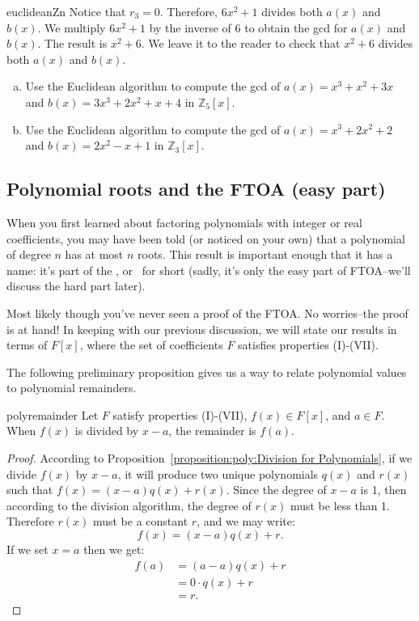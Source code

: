 \begin{example}{euclideanZn}
Notice that $r_3=0$. Therefore, $6x^2 + 1$ divides both $a(x)$ and $b(x)$. We multiply $6x^2 + 1$ by the inverse of 6 to obtain the gcd for $a(x)$ and $b(x)$. The result is $x^2+6$. We leave it to the reader to check that $x^2+6$ divides both $a(x)$ and $b(x)$.
\end{example}

\begin{exercise}{}
\begin{enumerate}[(a)]
\item
Use the Euclidean algorithm to compute the gcd of $a(x)=x^3+x^2+3x$ and  $b(x)=3x^3+2x^2+x+4$ in $\mathbb{Z}_5[x]$.
\item
Use the Euclidean algorithm to compute the gcd of $a(x)=x^3+2x^2+2$ and  $b(x)=2x^2-x+1$ in $\mathbb{Z}_3[x]$. 
\end{enumerate}
\end{exercise}

\subsection{Polynomial roots and the FTOA (easy part) \quad                                      
{}}\label{FTOA}
When you first learned about factoring polynomials with integer or real coefficients, you may have been told (or  noticed on your own) that a polynomial of degree $n$ has at most $n$ roots. This result is important enough that it has a name: it's part of the , or \ for short (sadly, it's only the easy part of FTOA--we'll discuss the hard part later). 

 Most likely though you've never seen a proof of the FTOA. No worries--the proof is at hand!   In keeping with our previous discussion, we will state our results in terms of $F[x]$, where the set of coefficients $F$ satisfies properties (I)-(VII).


The following preliminary proposition gives us a way to relate polynomial values to polynomial remainders.

\begin{prop}{polyremainder}
Let $F$ satisfy properties (I)-(VII), $f(x) \in F[x]$, and $a \in F$. When $f(x)$ is divided by $x-a$, the remainder is $f(a)$.
\end {prop}

\begin{proof}
According to Proposition~\ref{proposition:poly:Division for Polynomials}, if we divide $f(x)$ by $x-a$, it will produce two unique polynomials $q(x)$ and $r(x)$ such that $f(x) = (x-a)q(x) + r(x)$.  Since the degree of $x-a$ is 1, then according to the division algorithm, the degree of $r(x)$ must be less than 1.  Therefore $r(x)$ must be a constant $r$, and we may write:
\[f(x) = (x-a)q(x) + r.\]
If we set $x=a$ then we get:
\begin{align*}
f(a) &= (a-a)q(x) + r\\
& = 0 \cdot q(x) + r \\
& = r.
\end{align*}
\end {proof}

